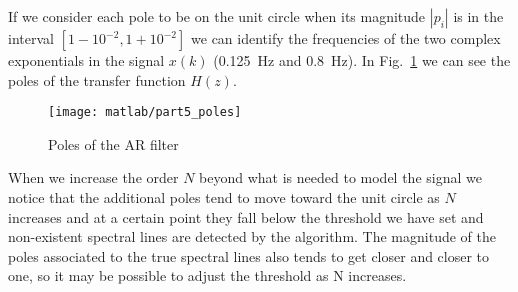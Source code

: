 \documentclass{article}
\begin{document}
If we consider each pole to be on the unit circle when its magnitude
$|p_i|$ is in the interval $[1-10^{-2},1+10^{-2}]$ we can identify the
frequencies of the two complex exponentials in the signal $x(k)$
(\SI{0.125}{\Hz} and \SI{0.8}{\Hz}). In Fig.~\ref{plot:part5_poles} we
can see the poles of the transfer function $H(z)$.
\begin{figure}[htbp]
  \centering
  \texttt{[image: matlab/part5\_poles]}
  \caption{Poles of the AR filter}
  \label{plot:part5_poles}
\end{figure}

When we increase the order $N$ beyond what is needed to model the
signal we notice that the additional poles tend to move toward the
unit circle as $N$ increases and at a certain point they fall below
the threshold we have set and non-existent spectral lines are detected
by the algorithm. The magnitude of the poles associated to the true
spectral lines also tends to get closer and closer to one, so it may
be possible to adjust the threshold as N increases.
\end{document}
